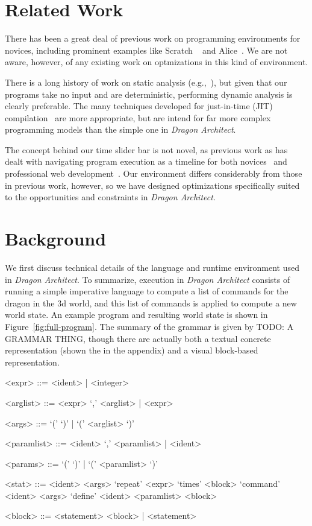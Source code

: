 \documentclass{sig-alternate}
\newcommand{\da}{\emph{Dragon Architect}}
\newcommand{\todo}[1]{{\color{red} TODO: #1}}
\begin{document}
\section{Related Work}
There has been a great deal of previous work on programming environments for novices, including prominent examples like Scratch ~\cite{resnick2009scratch} and Alice~\cite{cooper2000alice}. We are not aware, however, of any existing work on optmizations in this kind of environment. 

There is a long history of work on static analysis (e.g.,~\cite{cousot1977abstract}), but given that our programs take no input and are deterministic, performing dynamic analysis is clearly preferable. The many techniques developed for just-in-time (JIT) compilation~\cite{aycock2003brief} are more appropriate, but are intend for far more complex programming models than the simple one in \da.

The concept behind our time slider bar is not novel, as previous work as has dealt with navigating program execution as a timeline for both novices~\cite{ko2004designing} and professional web development~\cite{burg2013interactive}. Our environment differs considerably from those in previous work, however, so we have designed optimizations specifically suited to the opportunities and constraints in \da.

\section{Background}

We first discuss technical details of the language and runtime environment used in \da. To summarize, execution in \da{} consists of running a simple imperative language to compute a list of commands for the dragon in the 3d world, and this list of commands is applied to compute a new world state. An example program and resulting world state is shown in Figure~\ref{fig:full-program}. The summary of the grammar is given by \todo{A GRAMMAR THING}, though there are actually both a textual concrete representation (shown the in the appendix) and a visual block-based representation.

\begin{grammar}

<expr> ::= <ident> | <integer>

<arglist> ::= <expr> `,' <arglist> | <expr>

<args> ::= `(' `)' | `(' <arglist> `)'

<paramlist> ::= <ident> `,' <paramlist> | <ident>

<params> ::= `(' `)' | `(' <paramlist> `)'

<stat> ::= <ident> <args>
\alt `repeat' <expr> `times' <block>
\alt `command' <ident> <args>
\alt `define' <ident> <paramlist> <block>

<block> ::= <statement> <block> | <statement>

\end{grammar}
\end{document}
